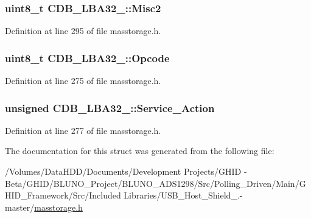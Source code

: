 \hypertarget{struct_c_d_b___l_b_a32__16_a3809ba2a5399bd407b50b04b8c83cb9f}{
\subsubsection[{\-Misc2}]{\setlength{\rightskip}{0pt plus 5cm}uint8\-\_\-t {\bf \-C\-D\-B\-\_\-\-L\-B\-A32\-\_\-::\-Misc2}}}\label{struct_c_d_b___l_b_a32__16_a3809ba2a5399bd407b50b04b8c83cb9f}


\-Definition at line 295 of file masstorage.\-h.

\hypertarget{struct_c_d_b___l_b_a32__16_abc471d94f83905561d961f4f90629521}{
\subsubsection[{\-Opcode}]{\setlength{\rightskip}{0pt plus 5cm}uint8\-\_\-t {\bf \-C\-D\-B\-\_\-\-L\-B\-A32\-\_\-::\-Opcode}}}\label{struct_c_d_b___l_b_a32__16_abc471d94f83905561d961f4f90629521}


\-Definition at line 275 of file masstorage.\-h.

\hypertarget{struct_c_d_b___l_b_a32__16_a7e845f1253ac116a6e9d7178f1f82b6d}{
\subsubsection[{\-Service\-\_\-\-Action}]{\setlength{\rightskip}{0pt plus 5cm}unsigned {\bf \-C\-D\-B\-\_\-\-L\-B\-A32\-\_\-::\-Service\-\_\-\-Action}}}\label{struct_c_d_b___l_b_a32__16_a7e845f1253ac116a6e9d7178f1f82b6d}


\-Definition at line 277 of file masstorage.\-h.



\-The documentation for this struct was generated from the following file\-:\begin{DoxyCompactItemize}
\item 
/\-Volumes/\-Data\-H\-D\-D/\-Documents/\-Development Projects/\-G\-H\-I\-D -\/ Beta/\-G\-H\-I\-D/\-B\-L\-U\-N\-O\-\_\-\-Project/\-B\-L\-U\-N\-O\-\_\-\-A\-D\-S1298/\-Src/\-Polling\-\_\-\-Driven/\-Main/\-G\-H\-I\-D\-\_\-\-Framework/\-Src/\-Included Libraries/\-U\-S\-B\-\_\-\-Host\-\_\-\-Shield\-\_.-\/master/\hyperlink{masstorage_8h}{masstorage.\-h}\end{DoxyCompactItemize}
